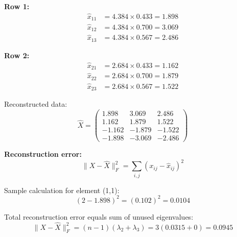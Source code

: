 \documentclass[12pt]{article}
\begin{document}
\begin{solution}
\textbf{Row 1:}
\begin{align*}
\hat{x}_{11} &= 4.384 \times 0.433 = 1.898 \\
\hat{x}_{12} &= 4.384 \times 0.700 = 3.069 \\
\hat{x}_{13} &= 4.384 \times 0.567 = 2.486
\end{align*}

\textbf{Row 2:}
\begin{align*}
\hat{x}_{21} &= 2.684 \times 0.433 = 1.162 \\
\hat{x}_{22} &= 2.684 \times 0.700 = 1.879 \\
\hat{x}_{23} &= 2.684 \times 0.567 = 1.522
\end{align*}

Reconstructed data:
\[
\hat{X} = \begin{pmatrix}
1.898 & 3.069 & 2.486 \\
1.162 & 1.879 & 1.522 \\
-1.162 & -1.879 & -1.522 \\
-1.898 & -3.069 & -2.486
\end{pmatrix}
\]

\textbf{Reconstruction error:}
\[
\|X - \hat{X}\|_F^2 = \sum_{i,j}(x_{ij} - \hat{x}_{ij})^2
\]

Sample calculation for element (1,1):
\[
(2 - 1.898)^2 = (0.102)^2 = 0.0104
\]

Total reconstruction error equals sum of unused eigenvalues:
\[
\|X - \hat{X}\|_F^2 = (n-1)(\lambda_2 + \lambda_3) = 3(0.0315 + 0) = 0.0945
\]

\end{solution}
\end{document}
